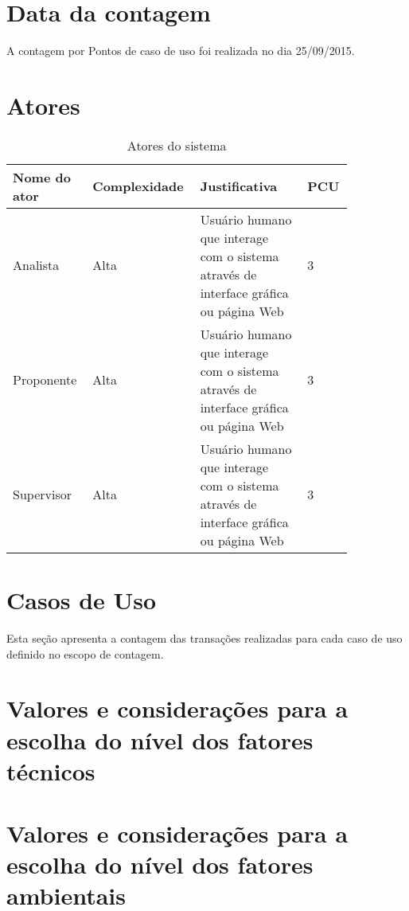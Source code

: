 \section{Data da contagem}
  
  A contagem por Pontos de caso de uso foi realizada no dia 25/09/2015.

\section{Atores}

\begin{table*}[!h]
\centering
\caption{Atores do sistema}
\label{atores}
  \begin{tabular}{|p{0.20\linewidth}|p{0.25\linewidth}|p{0.30\linewidth}|p{0.10\linewidth}|}
  \hline
  \textbf{Nome do ator} & \textbf{Complexidade} & \textbf{Justificativa} & \textbf{PCU} \\ 
  \hline

  Analista & Alta & Usuário humano que interage com o sistema através de interface gráfica ou página Web& 3 \\
  \hline
  Proponente & Alta & Usuário humano que interage com o sistema através de interface gráfica ou página Web& 3\\
  \hline
  Supervisor & Alta & Usuário humano que interage com o sistema através de interface gráfica ou página Web& 3\\
  \hline
  \end{tabular}
\end{table*}

\section{Casos de Uso}
  
  Esta seção apresenta a contagem das transações realizadas para cada caso de uso definido no escopo de contagem.

  

\section{Valores e considerações para a escolha do nível dos fatores técnicos}

\section{Valores e considerações para a escolha do nível dos fatores ambientais}

